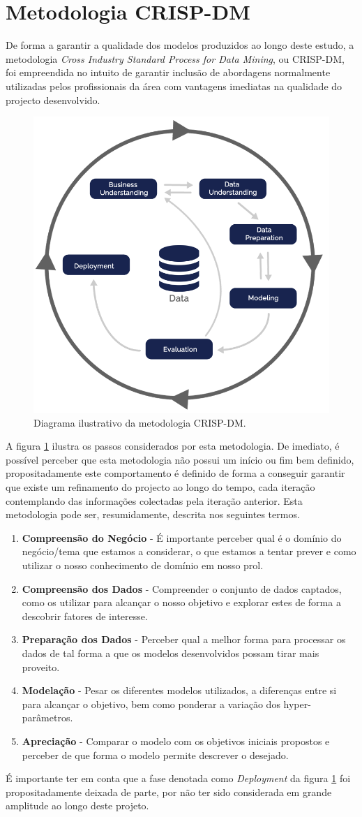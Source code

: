 \section{Metodologia CRISP-DM}

De forma a garantir a qualidade dos modelos produzidos ao longo deste estudo, a metodologia \textit{Cross Industry Standard Process for Data Mining}, ou CRISP-DM, foi empreendida no intuito de garantir inclusão de abordagens normalmente utilizadas pelos profissionais da área com vantagens imediatas na qualidade do projecto desenvolvido.

\begin{figure}[H]
    \centering
    \includegraphics[width=0.4\linewidth]{Figures/crispdm.png}
    \caption{Diagrama ilustrativo da metodologia CRISP-DM.}
    \label{fig:s2i1}
\end{figure}

A figura \ref{fig:s2i1} ilustra os passos considerados por esta metodologia. De imediato, é possível perceber que esta metodologia não possui um início ou fim bem definido, propositadamente este comportamento é definido de forma a conseguir garantir que existe um refinamento do projecto ao longo do tempo, cada iteração contemplando das informações colectadas pela iteração anterior. Esta metodologia pode ser, resumidamente, descrita nos seguintes termos.

\begin{enumerate}
    \item \textbf{Compreensão do Negócio} - É importante perceber qual é o domínio do negócio/tema que estamos a considerar, o que estamos a tentar prever e como utilizar o nosso conhecimento de domínio em nosso prol.
    \item \textbf{Compreensão dos Dados} - Compreender o conjunto de dados captados, como os utilizar para alcançar o nosso objetivo e explorar estes de forma a descobrir fatores de interesse.
    \item \textbf{Preparação dos Dados} - Perceber qual a melhor forma para processar os dados de tal forma a que os modelos desenvolvidos possam tirar mais proveito.
    \item \textbf{Modelação} - Pesar os diferentes modelos utilizados, a diferenças entre si para alcançar o objetivo, bem como ponderar a variação dos hyper-parâmetros.
    \item \textbf{Apreciação} - Comparar o modelo com os objetivos iniciais propostos e perceber de que forma o modelo permite descrever o desejado.
\end{enumerate}

É importante ter em conta que a fase denotada como \textit{Deployment} da figura \ref{fig:s2i1} foi propositadamente deixada de parte, por não ter sido considerada em grande amplitude ao longo deste projeto.